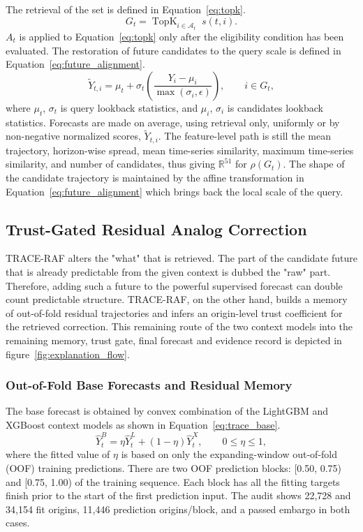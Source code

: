 \documentclass{ieeeaccess}
\begin{document}
The retrieval of the set is defined in Equation~\eqref{eq:topk}.
\begin{equation}
    G_t = \operatorname{TopK}_{i \in \mathcal{A}_t}\; s(t,i).
    \label{eq:topk}
\end{equation}
$A_{t}$ is applied to Equation~\eqref{eq:topk} only after the eligibility condition has been evaluated. The restoration of future candidates to the query scale is defined in Equation~\eqref{eq:future_alignment}.
\begin{equation}
\widetilde{Y}_{t,i}=\mu_t+\sigma_t
\left(\frac{Y_i-\mu_i}{\max(\sigma_i,\epsilon)}\right),
\qquad i\in G_t,
\label{eq:future_alignment}
\end{equation}
where $\mu_{t}$, $\sigma_{t}$ is query lookback statistics, and $\mu_{i}$, $\sigma_{i}$ is candidates lookback statistics. Forecasts are made on average, using retrieval only, uniformly or by non-negative normalized scores, $\widetilde{Y}_{t,i}$. The feature-level path is still the mean trajectory, horizon-wise spread, mean time-series similarity, maximum time-series similarity, and number of candidates, thus giving $\mathbb{R}^{51}$ for $\rho(G_t)$. The shape of the candidate trajectory is maintained by the affine transformation in Equation~\eqref{eq:future_alignment} which brings back the local scale of the query.

\subsection{Trust-Gated Residual Analog Correction}

TRACE-RAF alters the "what" that is retrieved. The part of the candidate future that is already predictable from the given context is dubbed the "raw" part. Therefore, adding such a future to the powerful supervised forecast can double count predictable structure. TRACE-RAF, on the other hand, builds a memory of out-of-fold residual trajectories and infers an origin-level trust coefficient for the retrieved correction. This remaining route of the two context models into the remaining memory, trust gate, final forecast and evidence record is depicted in figure~\ref{fig:explanation_flow}.

\subsubsection{Out-of-Fold Base Forecasts and Residual Memory}
The base forecast is obtained by convex combination of the LightGBM and XGBoost context models as shown in Equation~\eqref{eq:trace_base}.
\begin{equation}
\hat{Y}^{B}_t=\eta\hat{Y}^{L}_t+(1-\eta)\hat{Y}^{X}_t,
\qquad 0\leq\eta\leq1,
\label{eq:trace_base}
\end{equation}
where the fitted value of $\eta$ is based on only the expanding-window out-of-fold (OOF) training predictions. There are two OOF prediction blocks: [0.50, 0.75) and [0.75, 1.00) of the training sequence. Each block has all the fitting targets finish prior to the start of the first prediction input. The audit shows 22,728 and 34,154 fit origins, 11,446 prediction origins/block, and a passed embargo in both cases.
\end{document}
